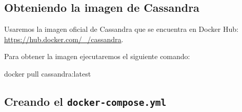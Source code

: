 \documentclass[
]{book}
\newenvironment{Shaded}{}{}
\newcommand{\ExtensionTok}[1]{#1}
\newcommand{\NormalTok}[1]{#1}
\begin{document}
\subsection{Obteniendo la imagen de Cassandra}\label{obteniendo-la-imagen-de-cassandra}

Usaremos la imagen oficial de Cassandra que se encuentra en Docker Hub: \url{https://hub.docker.com/_/cassandra}.

Para obtener la imagen ejecutaremos el siguiente comando:

\begin{Shaded}
\begin{Highlighting}[]
\ExtensionTok{docker}\NormalTok{ pull cassandra:latest}
\end{Highlighting}
\end{Shaded}

\subsection{\texorpdfstring{Creando el \texttt{docker-compose.yml}}{Creando el docker-compose.yml}}\label{creando-el-docker-compose.yml}
\end{document}
